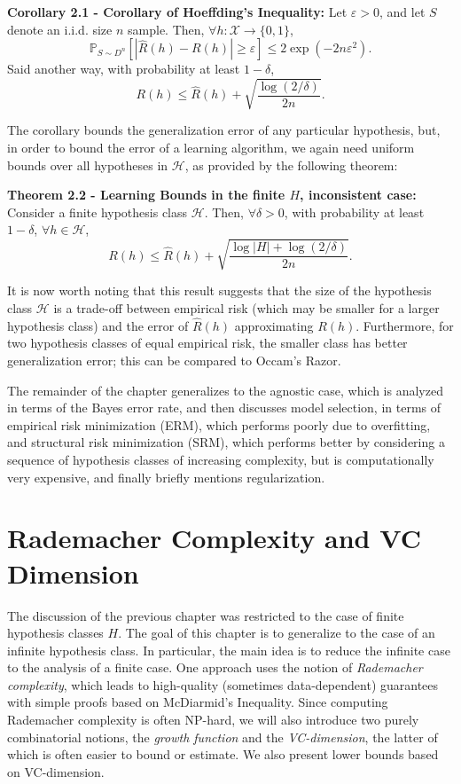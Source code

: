 \documentclass{article} %
\newcommand{\e}{\varepsilon}                        %
\newcommand{\X}{\mathcal{X}}                        %
\newcommand{\pr}{\mathbb{P}}                        %
\renewcommand{\hat}{\widehat}
\renewcommand{\H}{\mathcal{H}}
\begin{document}
{\bf Corollary 2.1 - Corollary of Hoeffding's Inequality:} Let $\e > 0$, and
let $S$ denote an i.i.d. size $n$ sample. Then, $\forall h : \X \to \{0,1\}$,
\[\pr_{S \sim D^n}\left[ |\hat R(h) - R(h)| \geq \e \right]
    \leq 2\exp(-2n\e^2).\]
Said another way, with probability at least $1 - \delta$,
\[R(h) \leq \hat R(h) + \sqrt{\frac{\log(2/\delta)}{2n}}.\]

The corollary bounds the generalization error of any particular hypothesis,
but, in order to bound the error of a learning algorithm, we again need uniform
bounds over all hypotheses in $\H$, as provided by the following theorem:

{\bf Theorem 2.2 - Learning Bounds in the finite $H$, inconsistent case:}
Consider a finite hypothesis class $\H$. Then, $\forall \delta > 0$, with
probability at least $1 - \delta$, $\forall h \in \H$,
\[R(h) \leq \hat R(h) + \sqrt{\frac{\log|H| + \log(2/\delta)}{2n}}.\]

It is now worth noting that this result suggests that the size of the
hypothesis class $\H$ is a trade-off between empirical risk (which may be
smaller for a larger hypothesis class) and the error of $\hat R(h)$
approximating $R(h)$. Furthermore, for two hypothesis classes of equal
empirical risk, the smaller class has better generalization error; this can be
compared to Occam's Razor.

The remainder of the chapter generalizes to the agnostic case, which is
analyzed in terms of the Bayes error rate, and then discusses model selection,
in terms of empirical risk minimization (ERM), which performs poorly due to
overfitting, and structural risk minimization (SRM), which performs better by
considering a sequence of hypothesis classes of increasing complexity, but
is computationally very expensive, and finally briefly mentions regularization.

\section{Rademacher Complexity and VC Dimension}
\label{sec:Rademacher}
The discussion of the previous chapter was restricted to the case of finite
hypothesis classes $H$. The goal of this chapter is to generalize to the case
of an infinite hypothesis class. In particular, the main idea is to reduce the
infinite case to the analysis of a finite case. One approach uses the notion of
\emph{Rademacher complexity}, which leads to high-quality (sometimes
data-dependent) guarantees with simple proofs based on McDiarmid's Inequality.
Since computing Rademacher complexity is often NP-hard, we will also introduce
two purely combinatorial notions, the \emph{growth function} and the
\emph{VC-dimension}, the latter of which is often easier to bound or estimate.
We also present lower bounds based on VC-dimension.
\end{document}
